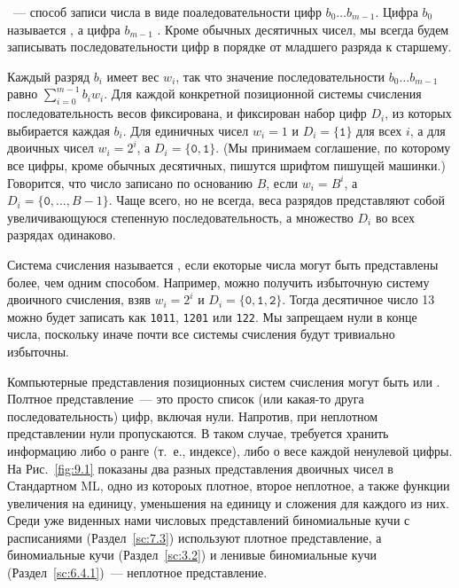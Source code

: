 \cite{Knuth1973b}~--- способ записи числа в виде поаледовательности
цифр $b_0\ldots b_{m-1}$. Цифра $b_0$ называется , а цифра $b_{m-1}$ . Кроме обычных десятичных чисел, мы всегда будем
записывать последовательности цифр в порядке от младшего разряда к старшему.

Каждый разряд $b_i$ имеет вес $w_i$, так что значение
последовательности $b_0\ldots b_{m-1}$ равно $\sum_{i=0}^{m-1}
b_iw_i$. Для каждой конкретной позиционной системы счисления
последовательность весов фиксирована, и фиксирован набор цифр $D_i$,
из которых выбирается каждая $b_i$. Для единичных чисел $w_i = 1$ и
$D_i = \{\mathtt{1}\}$ для всех $i$, а для двоичных чисел $w_i = 2^i$,
а $D_i = \{\mathtt{0}, \mathtt{1}\}$. (Мы принимаем соглашение, по
которому все цифры, кроме обычных десятичных, пишутся шрифтом пишущей
машинки.) Говорится, что число записано по основанию $B$, если $w_i =
B^i$, а $D_i = \{\mathtt{0}, \ldots, B-1\}$. Чаще всего, но не всегда,
веса разрядов представляют собой увеличивающуюся степенную
последовательность, а множество $D_i$ во всех разрядах одинаково.

Система счисления называется , если
екоторые числа могут быть представлены более, чем одним способом.
Например, можно получить избыточную систему двоичного счисления, взяв
$w_i = 2^i$ и $D_i = \{\mathtt{0}, \mathtt{1}, \mathtt{2}\}$. Тогда
десятичное число 13 можно будет записать как \texttt{1011},
\texttt{1201} или \texttt{122}. Мы запрещаем нули в конце числа,
поскольку иначе почти все системы счисления будут тривиально
избыточны.

Компьютерные представления позиционных систем счисления могут быть
 или . Полтное
представление~--- это просто список (или какая-то друга
последовательность) цифр, включая нули. Напротив, при неплотном
представлении нули пропускаются. В таком случае, требуется хранить
информацию либо о ранге (т.~е., индексе), либо о весе каждой ненулевой
цифры.  На Рис.~\ref{fig:9.1} показаны два разных представления
двоичных чисел в Стандартном ML, одно из котороых плотное, второе
неплотное, а также функции увеличения на единицу, уменьшения на
единицу и сложения для каждого из них. Среди уже виденных нами
числовых представлений биномиальные кучи с расписаниями
(Раздел~\ref{sc:7.3}) используют плотное представление, а биномиальные
кучи (Раздел~\ref{sc:3.2}) и ленивые биномиальные кучи
(Раздел~\ref{sc:6.4.1})~--- неплотное представление.

